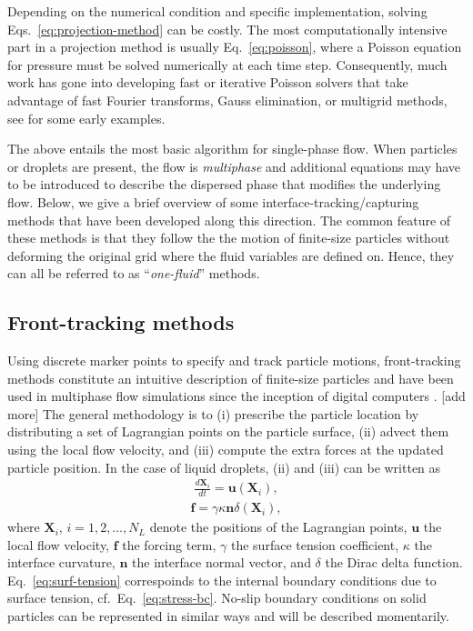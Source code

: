 Depending on the numerical condition and specific implementation, solving Eqs.\ \eqref{eq:projection-method} can be costly. The most computationally intensive part in a projection method is usually Eq.\ \eqref{eq:poisson}, where a Poisson equation for pressure must be solved numerically at each time step. Consequently, much work has gone into developing fast or iterative Poisson solvers that take advantage of fast Fourier transforms, Gauss elimination, or multigrid methods, see \cite{Buzbee_Golub_Nielson, Swarztrauber1977, multigrid_Brandt, Wesseling} for some early examples.

The above entails the most basic algorithm for single-phase flow.
When particles or droplets are present, the flow is \emph{multiphase} and additional equations may have to be introduced to describe the dispersed phase that modifies the underlying flow.
Below, we give a brief overview of some interface-tracking/capturing methods that have been developed along this direction.
The common feature of these methods is that they follow the the motion of finite-size particles without deforming the original grid where the fluid variables are defined on.
Hence, they can all be referred to as ``\emph{one-fluid}'' methods.


\subsection{Front-tracking methods}

Using discrete marker points to specify and track particle motions, front-tracking methods constitute an intuitive description of finite-size particles and have been used in multiphase flow simulations since the inception of digital computers \citep{Daly1969, unverdi_tryggvason_1992a, tryggvason_bunner_esmaeeli_juric_al-rawahi_tauber_han_nas_jan_2001a}. [add more] \quad
The general methodology is to (i) prescribe the particle location by distributing a set of Lagrangian points on the particle surface, (ii) advect them using the local flow velocity, and (iii) compute the extra forces at the updated particle position.
In the case of liquid droplets, (ii) and (iii) can be written as
\begin{equation}
 \begin{aligned}
   \frac{d \bm{X}_i}{dt} = \bm{u}(\bm{X}_i),
 \end{aligned}
\end{equation}
\begin{equation} \label{eq:surf-tension}
 \begin{aligned}
   \bm{f} = \gamma \kappa \bm{n} \delta (\bm{X}_i) ,
 \end{aligned}
\end{equation}
where $\bm{X}_i$, $i=1,2,\dots,N_L$ denote the positions of the Lagrangian points, $\bm u$ the local flow velocity, $\bm f$ the forcing term, $\gamma$ the surface tension coefficient, $\kappa$ the interface curvature, $\bm n$ the interface normal vector, and $\delta$ the Dirac delta function. Eq.\ \eqref{eq:surf-tension} correspoinds to the internal boundary conditions due to surface tension, cf.\ Eq.\ \eqref{eq:stress-bc}. No-slip boundary conditions on solid particles can be represented in similar ways and will be described momentarily.

